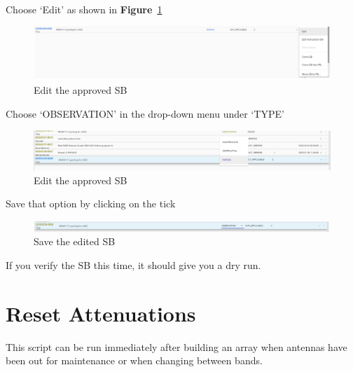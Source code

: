 Choose ‘Edit’ as shown in \textbf{Figure}~\ref{fig:image31}
\begin{figure}[H]
	\centering
	\includegraphics[scale=0.25]{Chapters/images/image31.png}
	
	\caption{Edit the approved SB}
	\label{fig:image31}
\end{figure}


Choose ‘OBSERVATION’ in the drop-down menu under ‘TYPE’

\begin{figure}[H]
	\centering
	\includegraphics[scale=0.37]{Chapters/images/image53.png}
	
	\caption{Edit the approved SB}
	\label{fig:image53}
\end{figure}


Save that option by clicking on the tick



\begin{figure}[!thb]
	\centering
	\includegraphics[scale=0.4]{Chapters/images/ManualSB.png}
	
	\caption{Save the edited SB }
	\label{fig:ManualSB}
\end{figure}

If you verify the SB this time, it should give you a dry run.

\section{Reset Attenuations}

This script can be run immediately after building an array when antennas have been out for maintenance or when changing between bands.

